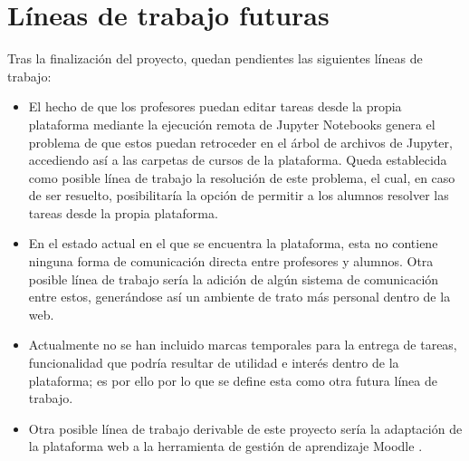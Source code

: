 \section{Líneas de trabajo futuras}
Tras la finalización del proyecto, quedan pendientes las siguientes líneas de trabajo:
\begin{itemize}
\item El hecho de que los profesores puedan editar tareas desde la propia plataforma mediante la ejecución remota de Jupyter Notebooks genera el problema de que estos puedan retroceder en el árbol de archivos de Jupyter, accediendo así a las carpetas de cursos de la plataforma. Queda establecida como posible línea de trabajo la resolución de este problema, el cual, en caso de ser resuelto, posibilitaría la opción de permitir a los alumnos resolver las tareas desde la propia plataforma.
\item En el estado actual en el que se encuentra la plataforma, esta no contiene ninguna forma de comunicación directa entre profesores y alumnos. Otra posible línea de trabajo sería la adición de algún sistema de comunicación entre estos, generándose así un ambiente de trato más personal dentro de la web. 
\item Actualmente no se han incluido marcas temporales para la entrega de tareas, funcionalidad que podría resultar de utilidad e interés dentro de la plataforma; es por ello por lo que se define esta como otra futura línea de trabajo.
\item Otra posible línea de trabajo derivable de este proyecto sería la adaptación de la plataforma web a la herramienta de gestión de aprendizaje Moodle \cite{Moodle}.
\end{itemize}